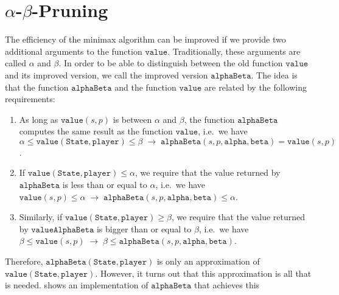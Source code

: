\section{$\alpha$-$\beta$-Pruning}
The efficiency of the minimax algorithm can be improved if we provide two additional arguments to the function
$\mathtt{value}$.  Traditionally, these arguments are called $\alpha$ and $\beta$.  In order to be able to
distinguish between the old function $\mathtt{value}$ and its improved version, we call the improved version 
$\mathtt{alphaBeta}$.  The idea is that the function $\mathtt{alphaBeta}$ and the function $\mathtt{value}$ are
related by the following requirements: 
\begin{enumerate}
\item As long as $\mathtt{value}(s, p)$ is between $\alpha$ and $\beta$, the function
      $\mathtt{alphaBeta}$ computes the same result as the function $\mathtt{value}$,
      i.e.~we have
      \\[0.2cm]
      \hspace*{0.3cm}
      $\alpha \leq \mathtt{value}(\mathtt{State}, \mathtt{player}) \leq \beta \;\rightarrow\;
         \mathtt{alphaBeta}(s, p, \mathtt{alpha}, \mathtt{beta}) = \mathtt{value}(s,p)
      $.
\item If $\mathtt{value}(\mathtt{State},\mathtt{player}) \leq \alpha$, we require that the value returned by
      $\mathtt{alphaBeta}$ is less than or equal to $\alpha$, i.e.~we have 
      \\[0.2cm]
      \hspace*{0.3cm}
      $\mathtt{value}(s, p) \leq \alpha \;\rightarrow\;
       \mathtt{alphaBeta}(s, p, \mathtt{alpha}, \mathtt{beta}) \leq \alpha
      $.
\item Similarly, if $\mathtt{value}(\mathtt{State},\mathtt{player}) \geq \beta$, we require that the value
      returned by $\mathtt{valueAlphaBeta}$ is bigger than or equal to $\beta$, i.e.~we have 
      \\[0.2cm]
      \hspace*{0.3cm}
      $\beta \leq \mathtt{value}(s, p) \;\rightarrow\;
        \beta \leq \mathtt{alphaBeta}(s, p, \mathtt{alpha}, \mathtt{beta}) 
      $.
\end{enumerate}
Therefore, $\mathtt{alphaBeta}(\mathtt{State}, \mathtt{player})$  is only an approximation of
$\mathtt{value}(\mathtt{State}, \mathtt{player})$.  However, it turns out that this approximation is all that
is needed.   shows an implementation of $\mathtt{alphaBeta}$ that achieves this
